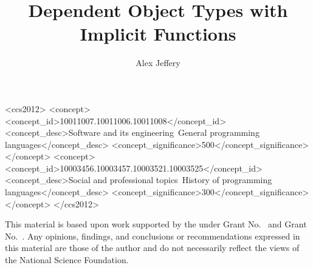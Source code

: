 \documentclass[sigplan,review]{acmart}\settopmatter{printfolios=true,printccs=false,printacmref=false}
\begin{document}
\title{Dependent Object Types with Implicit Functions}
\author{Alex Jeffery}




\begin{CCSXML}
<ccs2012>
<concept>
<concept_id>10011007.10011006.10011008</concept_id>
<concept_desc>Software and its engineering~General programming languages</concept_desc>
<concept_significance>500</concept_significance>
</concept>
<concept>
<concept_id>10003456.10003457.10003521.10003525</concept_id>
<concept_desc>Social and professional topics~History of programming languages</concept_desc>
<concept_significance>300</concept_significance>
</concept>
</ccs2012>
\end{CCSXML}





\maketitle



%





\begin{acks}                            %
  This material is based upon work supported by the
   under Grant
  No.~ and Grant
  No.~.  Any opinions, findings, and
  conclusions or recommendations expressed in this material are those
  of the author and do not necessarily reflect the views of the
  National Science Foundation.
\end{acks}





\end{document}
